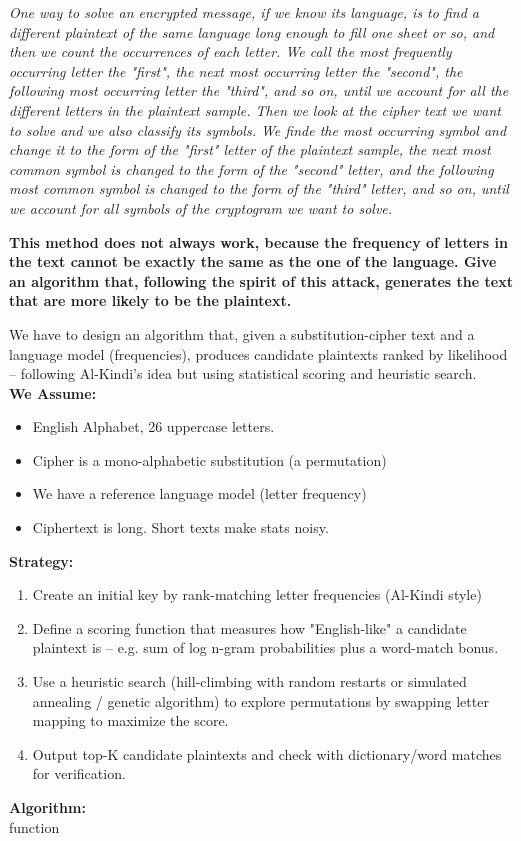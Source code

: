 \documentclass[]{article}
\begin{document}
\medskip

\noindent
\textit{One way to solve an encrypted message, if we know its language, is to find a different plaintext of the same language long enough to fill one sheet or so, and then we count the occurrences of each letter. We call the most frequently occurring letter the "first", the next most occurring letter the "second", the following most occurring letter the "third", and so on, until we account for all the different letters in the plaintext sample. Then we look at the cipher text we want to solve and we also classify its symbols. We finde the most occurring symbol and change it to the form of the "first" letter of the plaintext sample, the next most common symbol is changed to the form of the "second" letter, and the following most common symbol is changed to the form of the "third" letter, and so on, until we account for all symbols of the cryptogram we want to solve.} 

\medskip \noindent
\textbf{This method does not always work, because the frequency of letters in the text cannot be exactly the same as the one of the language. Give an algorithm that, following the spirit of this attack, generates the text that are more likely to be the plaintext.}

\medskip \noindent
We have to design an algorithm that, given a substitution-cipher text and a language model (frequencies), produces candidate plaintexts ranked by likelihood -- following Al-Kindi's idea but using statistical scoring and heuristic search. \\

\noindent \textbf{We Assume:} 
\begin{itemize}
	\item English Alphabet, 26 uppercase letters.
	\item Cipher is a mono-alphabetic substitution (a permutation)
	\item We have a reference language model (letter frequency)
	\item Ciphertext is long. Short texts make stats noisy.
\end{itemize} 
\textbf{Strategy:}
\begin{enumerate}
	\item Create an initial key by rank-matching letter frequencies (Al-Kindi style)
	\item Define a scoring function that measures how "English-like" a candidate plaintext is -- e.g. sum of log n-gram probabilities plus a word-match bonus.
	\item Use a heuristic search (hill-climbing with random restarts or simulated annealing / genetic algorithm) to explore permutations by swapping letter mapping to maximize the score.
	\item Output top-K candidate plaintexts and check with dictionary/word matches for verification.
\end{enumerate}
\textbf{Algorithm:} \\
function 
\end{document}
